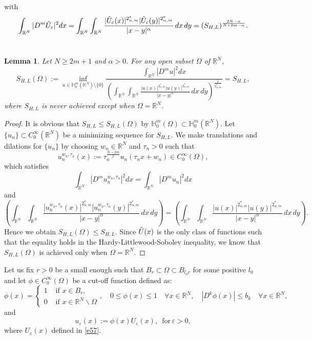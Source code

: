 \documentclass[reqno]{amsart}
\newtheorem{lemma}[theorem]{Lemma}
\newcommand{\DD} {\displaystyle}
\newcommand{\eps}{\varepsilon}
\newcommand{\Om}{\Omega}
\newcommand{\al} {\alpha}
\newcommand{\noi} {  \noindent}
\newcommand{\mb} {\mathbb}
\numberwithin{theorem}{section} \numberwithin{equation}{section}
\begin{document}
with
\[\int_{\mb{R}^N}|D^m\Tilde{U}_\eps|^2 dx=\int_{\mb{R}^N}\int_{\mb{R}^N} \frac{|\Tilde{U}_\eps(x)|^{2_{\al, m}^*}|\Tilde{U}_\eps(y)|^{2_{\al, m}^*}}{|x-y|^\al}\, dx \, dy =(S_{H, L})^{\frac{2N-\al}{N+2m-\al}}.\]\\
\begin{lemma}
 Let $N\geq2m+1$ and $\al>0$. For any open subset $\Om$ of $\mb{R}^N$,
\[S_{H, L}(\Om):= \inf_{u \in\mb{H}_0^{m}(\mb{R}^N) \setminus \{0\}} \frac{\int_{\mb{R}^N} |D^m u|^2 dx}{\left( \int_{\mb{R}^N} \int_{\mb{R}^N} \frac{|u(x)|^{2_{\al, m}^*} |u(y)|^{2_{\al, m}^*}}{|x - y|^\al} \, dx \, dy \right)^\frac{1}{2_{\al, m}^*}} =S_{H, L},\]
where $S_{H, L}$ is never achieved except when $\Om =\mb{R}^N$.
\end{lemma}
\begin{proof}
 It is obvious that $S_{H, L}\leq S_{H, L}(\Om)$ by $\mb{H}_0^{m}(\Om)\subset \mb{H}_0^{m}(\mb{R}^N)$. Let $\{u_n\} \subset C_0^{\infty} (\mb{R}^N)$ be a minimizing sequence for $S_{H, L}$. We make translations and dilations for $\{u_n\}$ by choosing $w_n \in\mb{R}^N $ and $\tau_n >0$ such that 
\[u_n^{w_n, \tau_n}(x) :=\tau_n^{\frac{N-2m}{2}} u_n(\tau_n x+ w_n) \in C_0^{\infty} (\Om),\]
which satisfies
\[\DD\int_{\mb{R}^N}\left|D^m u_n^{w_n, \tau_n}\right|^2 dx =\DD\int_{\mb{R}^N}\left|D^m u_n\right|^2 dx\]
and
\[\left( \int_{\mb{R}^N} \int_{\mb{R}^N} \frac{|u_n^{w_n, \tau_n}(x)|^{2_{\al, m}^*} |u_n^{w_n, \tau_n}(y)|^{2_{\al, m}^*}}{|x - y|^\al} \, dx \, dy \right) =\left( \int_{\mb{R}^N} \int_{\mb{R}^N} \frac{|u(x)|^{2_{\al, m}^*} |u(y)|^{2_{\al, m}^*}}{|x - y|^\al} \, dx \, dy \right).\]
Hence we obtain $S_{H, L}(\Om)\leq S_{H, L}.$ Since $\Tilde{U}(x)$ is the only class of functions such that the equality holds in the Hardy-Littlewood-Sobolev inequality, we know that $S_{H, L}(\Om)$ is achieved only when $\Om=\mb{R}^N$.
\end{proof}
\noi Let us fix $r>0$ be a small enough such that $B_r \subset \Om \subset B_{l_0 r}$ for some positive $l_0$ and let $\phi \in C_0^{\infty}(\Om)$ be a cut-off function defined as:
\[\phi(x)= \begin{cases}1 & \text { if } x \in B_r, \\
0 & \text { if } x \in \mb{R}^N \backslash \Om \end{cases} , 
\quad 0 \leq \phi(x) \leq 1 \quad \forall x \in \mb{R}^N, \quad |D^k\phi(x)|\leq b_k\quad \forall x \in \mb{R}^N,\]
and
\begin{equation}\label{e10}
u_\eps(x) :=\phi(x) U_\eps(x), \,  \text{ for} \, \eps>0,
\end{equation} 
where $U_\eps(x)$ defined in \eqref{e57}.
\end{document}
